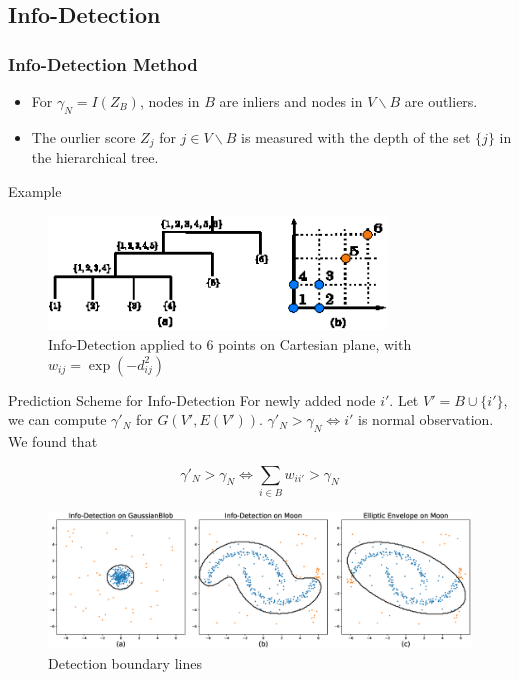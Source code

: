 \documentclass[notheorems]{beamer}
\begin{document}
\subsection{Info-Detection}
\begin{frame}
	\frametitle{Info-Detection Method}
\begin{itemize}
\item For $\gamma_N = I(Z_B)$, nodes in $B$ are inliers and nodes in $V\backslash B$ are outliers.
\item The ourlier score $Z_j$ for $j \in V\backslash B$ is measured with the depth of the set $\{j\}$ in the hierarchical tree.
\end{itemize}
Example
	\begin{figure}
		\centering
		\includegraphics[width=9cm]{pic/outlier_example.eps}
		\caption*{Info-Detection applied to 6 points on Cartesian plane, with $w_{ij} = \exp(-d_{ij}^2)$}\label{fig:ex}
	\end{figure}
\end{frame}
\begin{frame}{Prediction Scheme for Info-Detection}
For newly added node $i'$. Let $V'=B\cup \{i'\}$, we can compute $\gamma'_N$ for $G(V', E(V'))$.
$ \gamma'_N > \gamma_N \iff i'$ is normal observation. We found that
\begin{proposition}
\begin{equation}
\gamma'_N > \gamma_N \iff  \sum_{i \in B} w_{ii'} > \gamma_N 
\end{equation}
\end{proposition}
\begin{figure}
	\centering
	\includegraphics[width=\textwidth]{pic/outlier_boundary_illustration.eps}
	\caption*{Detection boundary lines}	\label{fig:boundary}
\end{figure}
\end{frame}
\end{document}
